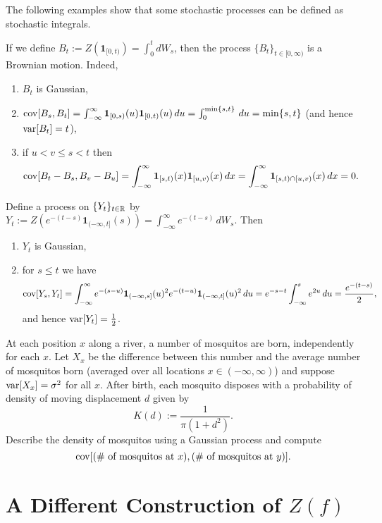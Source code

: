 \documentclass[../../../Master/AppliedStochastics.tex]{subfiles}
\begin{document}
The following examples show that some stochastic processes can be defined as stochastic integrals.

\begin{exmp} If we define $B_t:=Z(\mathbf{1}_{[0,t)})=\int_0^tdW_s$, then the process $\{B_t\}_{t\in[0,\infty)}$ is a Brownian motion. Indeed,
\begin{enumerate}[label=(\roman*)]
\item $B_t$ is Gaussian,
\item $\operatorname{cov}[B_s,B_t]=\int_{-\infty}^\infty\mathbf{1}_{[0,s)}(u)\mathbf{1}_{[0,t)}(u)\,du=\int_0^{\min\{s,t\}}\,du=\min\{s,t\}$ (and hence $\operatorname{var}[B_t]=t$),
\item if $u<v\leq s<t$ then $$\operatorname{cov}[B_t-B_s,B_v-B_u]=\int_{-\infty}^\infty\mathbf{1}_{[s,t)}(x)\mathbf{1}_{[u,v)}(x)\,dx=\int_{-\infty}^\infty\mathbf{1}_{[s,t)\cap[u,v)}(x)\,dx=0.$$
\end{enumerate}
\end{exmp}

\begin{exmp}[Energy]
Define a process on $\{Y_t\}_{t\in\mathbb{R}}$ by $Y_t:=Z\left(e^{-(t-s)}\mathbf{1}_{(-\infty,t]}(s)\right)=\int_{-\infty}^\infty e^{-(t-s)}\,dW_s.$ Then
\begin{enumerate}[label=(\roman*)]
\item $Y_t$ is Gaussian,
\item for $s\leq t$ we have $$\operatorname{cov}[Y_s,Y_t]=\int_{-\infty}^\infty e^{-(s-u)}\mathbf{1}_{(-\infty,s]}(u)^2e^{-(t-u)}\mathbf{1}_{(-\infty,t]}(u)^2\,du=e^{-s-t}\int_{-\infty}^se^{2u}\,du=\frac{e^{-(t-s)}}{2},$$ and hence $\operatorname{var}[Y_t]=\frac{1}{2}$.
\end{enumerate}
\end{exmp}

\begin{exer}
At each position $x$ along a river, a number of mosquitos are born, independently for each $x$. Let $X_x$ be the difference between this number and the average number of mosquitos born (averaged over all locations $x\in(-\infty,\infty)$) and suppose $\operatorname{var}[X_x]=\sigma^2$ for all $x$. After birth, each mosquito disposes with a probability of density of moving displacement $d$ given by $$K(d):=\frac{1}{\pi(1+d^2)}.$$ Describe the density of mosquitos using a Gaussian process and compute $$\operatorname{cov}[(\#\text{ of mosquitos at }x),(\#\text{ of mosquitos at }y)].$$
\end{exer}


\section{A Different Construction of $Z(f)$}
\end{document}
